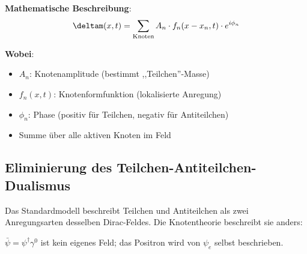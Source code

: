 	\textbf{Mathematische Beschreibung}:
	\begin{equation}
		\deltam(x,t) = \sum_{\text{Knoten}} A_n \cdot f_n(x-x_n, t) \cdot e^{i\phi_n}
	\end{equation}
	
	\textbf{Wobei}:
	\begin{itemize}
		\item $A_n$: Knotenamplitude (bestimmt ,,Teilchen''-Masse)
		\item $f_n(x,t)$: Knotenformfunktion (lokalisierte Anregung)
		\item $\phi_n$: Phase (positiv für Teilchen, negativ für Antiteilchen)
		\item Summe über alle aktiven Knoten im Feld
	\end{itemize}
	
	\subsection{Eliminierung des Teilchen-Antiteilchen-Dualismus}
	
	Das Standardmodell beschreibt Teilchen und Antiteilchen als zwei Anregungsarten desselben Dirac-Feldes. Die Knotentheorie beschreibt sie anders:
	
	\begin{table}[htbp]
		\centering
		\caption{Eliminierung des Teilchen-Antiteilchen-Dualismus durch die Knotentheorie}
		\label{tab:node_theory_comparison}
	\end{table}
	
	$\bar{\psi} = \psi^\dagger\gamma^0$ ist kein eigenes Feld; das Positron wird von $\psi_e$ selbst beschrieben.
	
